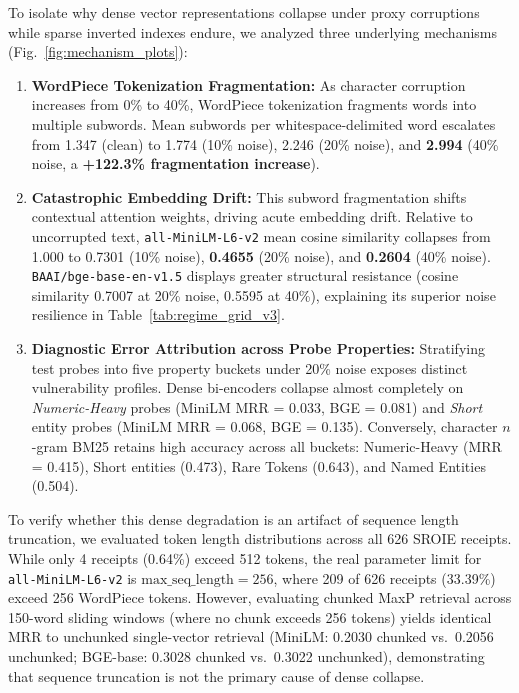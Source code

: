 \documentclass[conference]{IEEEtran}
\begin{document}
To isolate why dense vector representations collapse under proxy corruptions while sparse inverted indexes endure, we analyzed three underlying mechanisms (Fig.~\ref{fig:mechanism_plots}):
\begin{enumerate}
    \setlength{\itemsep}{0.2pt plus 0.1pt}
    \setlength{\parskip}{0pt}
    \item \textbf{WordPiece Tokenization Fragmentation:} As character corruption increases from 0\% to 40\%, WordPiece tokenization fragments words into multiple subwords. Mean subwords per whitespace-delimited word escalates from 1.347 (clean) to 1.774 (10\% noise), 2.246 (20\% noise), and \textbf{2.994} (40\% noise, a \textbf{+122.3\% fragmentation increase}).
    \item \textbf{Catastrophic Embedding Drift:} This subword fragmentation shifts contextual attention weights, driving acute embedding drift. Relative to uncorrupted text, \texttt{all-MiniLM-L6-v2} mean cosine similarity collapses from 1.000 to 0.7301 (10\% noise), \textbf{0.4655} (20\% noise), and \textbf{0.2604} (40\% noise). \texttt{BAAI/bge-base-en-v1.5} displays greater structural resistance (cosine similarity 0.7007 at 20\% noise, 0.5595 at 40\%), explaining its superior noise resilience in Table~\ref{tab:regime_grid_v3}.
    \item \textbf{Diagnostic Error Attribution across Probe Properties:} Stratifying test probes into five property buckets under 20\% noise exposes distinct vulnerability profiles. Dense bi-encoders collapse almost completely on \emph{Numeric-Heavy} probes (MiniLM MRR = 0.033, BGE = 0.081) and \emph{Short} entity probes (MiniLM MRR = 0.068, BGE = 0.135). Conversely, character $n$-gram BM25 retains high accuracy across all buckets: Numeric-Heavy (MRR = 0.415), Short entities (0.473), Rare Tokens (0.643), and Named Entities (0.504).
\end{enumerate}

To verify whether this dense degradation is an artifact of sequence length truncation, we evaluated token length distributions across all 626 SROIE receipts. While only 4 receipts (0.64\%) exceed 512 tokens, the real parameter limit for \texttt{all-MiniLM-L6-v2} is $\text{max\_seq\_length}=256$, where 209 of 626 receipts (33.39\%) exceed 256 WordPiece tokens. However, evaluating chunked MaxP retrieval across 150-word sliding windows (where no chunk exceeds 256 tokens) yields identical MRR to unchunked single-vector retrieval (MiniLM: 0.2030 chunked vs.\ 0.2056 unchunked; BGE-base: 0.3028 chunked vs.\ 0.3022 unchunked), demonstrating that sequence truncation is not the primary cause of dense collapse.
\end{document}
